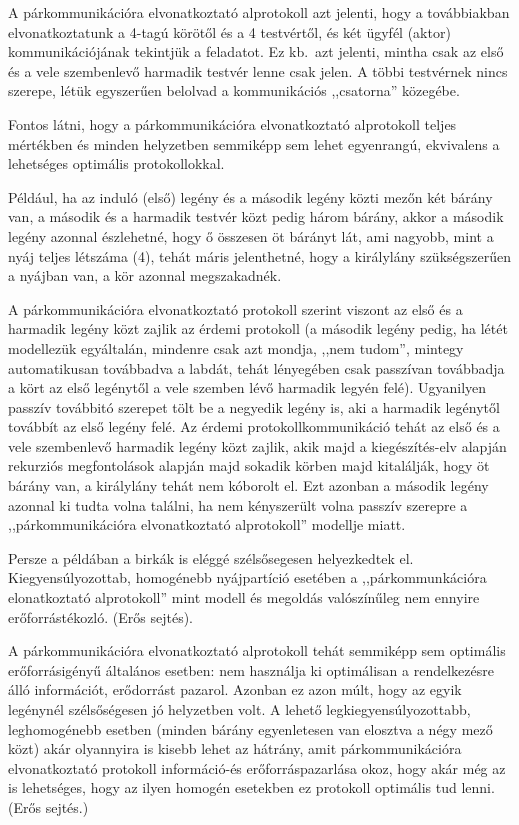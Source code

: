 \documentclass{article}
\begin{document}
	A párkommunikációra elvonatkoztató alprotokoll azt jelenti, hogy a továbbiakban elvonatkoztatunk a 4-tagú körötől és a 4 testvértől, és két ügyfél (aktor) kommunikációjának tekintjük a feladatot.
	Ez kb.~azt jelenti, mintha csak az első és a vele szembenlevő harmadik testvér lenne csak jelen. A többi testvérnek nincs szerepe, létük egyszerűen belolvad a kommunikációs ,,csatorna'' közegébe. 

	Fontos látni, hogy a párkommunikációra elvonatkoztató alprotokoll teljes mértékben és minden helyzetben semmiképp sem lehet egyenrangú, ekvivalens a lehetséges optimális protokollokkal.

	Például, ha az induló (első) legény és a második legény közti mezőn két bárány van, a második és a harmadik testvér közt pedig három bárány, akkor a második legény azonnal észlehetné, hogy ő összesen öt bárányt lát, ami nagyobb, mint a nyáj teljes létszáma (4), tehát máris jelenthetné, hogy a királylány szükségszerűen a nyájban van, a kör azonnal megszakadnék.

	A párkommunikációra elvonatkoztató protokoll szerint viszont az első és a harmadik legény közt zajlik az  érdemi protokoll (a második legény pedig, ha létét modellezük egyáltalán, mindenre csak azt mondja, ,,nem tudom'', mintegy automatikusan továbbadva a labdát, tehát lényegében csak passzívan továbbadja a kört az első legénytől a vele szemben lévő harmadik legyén felé). Ugyanilyen passzív továbbitó szerepet tölt be a negyedik legény is, aki a harmadik legénytől továbbít az első legény felé. Az érdemi protokollkommunikáció tehát az első és a vele szembenlevő harmadik legény közt zajlik, akik majd a kiegészítés-elv alapján rekurziós megfontolások alapján majd sokadik körben majd kitalálják, hogy öt bárány van, a királylány tehát nem kóborolt el. Ezt azonban a második legény azonnal ki tudta volna találni, ha nem kényszerült volna passzív szerepre a ,,párkommunikációra elvonatkoztató alprotokoll'' modellje miatt.

	Persze a példában a birkák is eléggé szélsősegesen helyezkedtek el. Kiegyensúlyozottab, homogénebb nyájpartíció esetében a ,,párkommunkációra elonatkoztató alprotokoll'' mint modell és megoldás valószínűleg nem ennyire erőforrástékozló. (Erős sejtés).

	A párkommunikációra elvonatkoztató alprotokoll tehát semmiképp sem optimális erőforrásigényű általános esetben: nem használja ki optimálisan a rendelkezésre álló információt, erődorrást pazarol. Azonban ez azon múlt, hogy az egyik legénynél szélsőségesen jó helyzetben volt. A lehető legkiegyensúlyozottabb, leghomogénebb esetben (minden bárány egyenletesen van elosztva a négy mező közt) akár olyannyira is kisebb lehet az  hátrány, amit párkommunikációra elvonatkoztató protokoll információ-és erőforráspazarlása okoz, hogy akár még az is lehetséges, hogy az ilyen homogén esetekben ez  protokoll optimális tud lenni. (Erős sejtés.)
\end{document}
